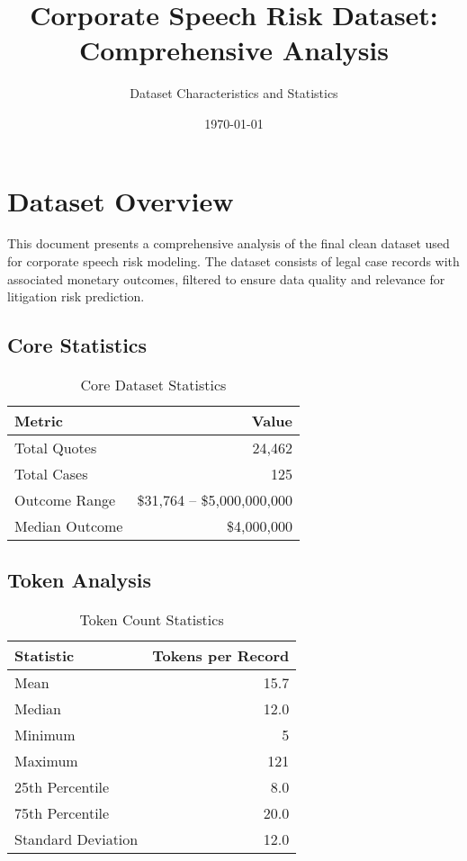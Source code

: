 \documentclass[11pt]{article}
\title{Corporate Speech Risk Dataset: Comprehensive Analysis}
\author{Dataset Characteristics and Statistics}
\date{\today}
\begin{document}
\maketitle

\section{Dataset Overview}

This document presents a comprehensive analysis of the final clean dataset used for corporate speech risk modeling. The dataset consists of legal case records with associated monetary outcomes, filtered to ensure data quality and relevance for litigation risk prediction.

\subsection{Core Statistics}

\begin{table}[H]
\centering
\caption{Core Dataset Statistics}
\begin{tabular}{lr}
\toprule
\textbf{Metric} & \textbf{Value} \\
\midrule
Total Quotes & 24,462 \\
Total Cases & 125 \\
Outcome Range & \$31,764 -- \$5,000,000,000 \\
Median Outcome & \$4,000,000 \\
\bottomrule
\end{tabular}
\end{table}

\subsection{Token Analysis}

\begin{table}[H]
\centering
\caption{Token Count Statistics}
\begin{tabular}{lr}
\toprule
\textbf{Statistic} & \textbf{Tokens per Record} \\
\midrule
Mean & 15.7 \\
Median & 12.0 \\
Minimum & 5 \\
Maximum & 121 \\
25th Percentile & 8.0 \\
75th Percentile & 20.0 \\
Standard Deviation & 12.0 \\
\bottomrule
\end{tabular}
\end{table}
\end{document}
